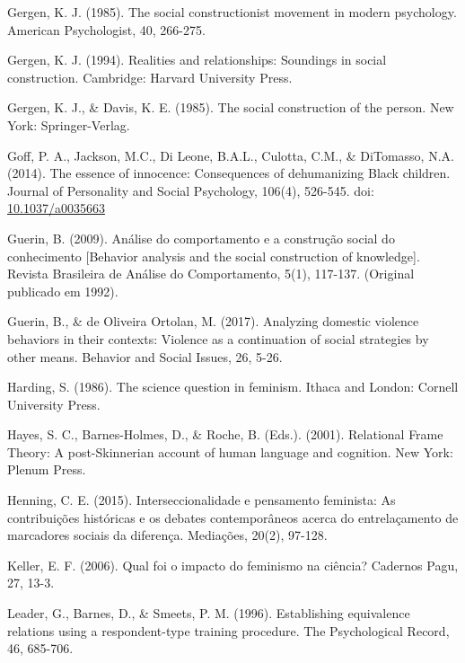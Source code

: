 \hangindent=25pt
\noindent Gergen, K. J. (1985). The social constructionist movement in modern psychology. American Psychologist, 40, 266-275.

\hangindent=25pt
\noindent Gergen, K. J. (1994). Realities and relationships: Soundings in social construction. Cambridge: Harvard University Press.

\hangindent=25pt
\noindent Gergen, K. J., \& Davis, K. E. (1985). The social construction of the person. New York: Springer-Verlag. 

\hangindent=25pt
\noindent Goff, P. A., Jackson, M.C., Di Leone, B.A.L., Culotta, C.M., \& DiTomasso, N.A. (2014). The essence of innocence: Consequences of dehumanizing Black children. Journal of Personality and Social Psychology, 106(4), 526-545. doi: \url{10.1037/a0035663}

\hangindent=25pt
\noindent Guerin, B. (2009). Análise do comportamento e a construção social do conhecimento [Behavior analysis and the social construction of knowledge]. Revista Brasileira de Análise do Comportamento, 5(1), 117-137. (Original publicado em 1992).

\hangindent=25pt
\noindent Guerin, B., \& de Oliveira Ortolan, M. (2017). Analyzing domestic violence behaviors in their contexts: Violence as a continuation of social strategies by other means. Behavior and Social Issues, 26, 5-26.

\hangindent=25pt
\noindent Harding, S. (1986). The science question in feminism. Ithaca and London: Cornell University Press. 

\hangindent=25pt
\noindent Hayes, S. C., Barnes-Holmes, D., \& Roche, B. (Eds.). (2001). Relational Frame Theory: A post-Skinnerian account of human language and cognition. New York: Plenum Press.

\hangindent=25pt
\noindent Henning, C. E. (2015). Interseccionalidade e pensamento feminista: As contribuições históricas e os debates contemporâneos acerca do entrelaçamento de marcadores sociais da diferença. Mediações, 20(2), 97-128. 

\hangindent=25pt
\noindent Keller, E. F. (2006). Qual foi o impacto do feminismo na ciência? Cadernos Pagu, 27, 13-3. 

\hangindent=25pt
\noindent Leader, G., Barnes, D., \& Smeets, P. M. (1996). Establishing equivalence relations using a respondent-type training procedure. The Psychological Record, 46, 685-706.


